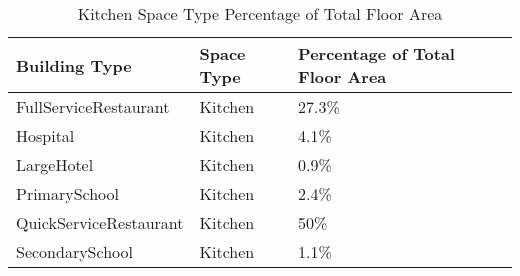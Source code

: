 \begin{table}[h!]
\small
\centering
\caption[Kitchen Space Type Percentage of Total Floor Area]{Kitchen Space Type Percentage of Total Floor Area}
\label{tab:kitchen_floor_area}
\begin{tabular}{|l|l|l|}
\hline
\textbf{Building Type}          & \textbf{Space Type} & \textbf{Percentage of Total Floor Area} \\ \hline
FullServiceRestaurant  & Kitchen    & 27.3\%                         \\ \hline
Hospital               & Kitchen    & 4.1\%                          \\ \hline
LargeHotel             & Kitchen    & 0.9\%                          \\ \hline
PrimarySchool          & Kitchen    & 2.4\%                          \\ \hline
QuickServiceRestaurant & Kitchen    & 50\%                           \\ \hline
SecondarySchool        & Kitchen    & 1.1\%                          \\ \hline
\end{tabular}
\end{table}